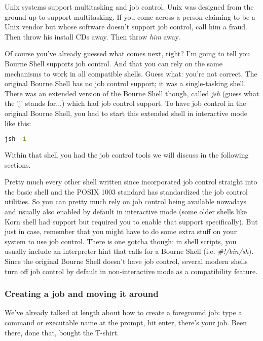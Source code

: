 Unix systems support multitasking and job control. Unix was designed from the
ground up to support multitasking. If you come across a person claiming to be a
Unix vendor but whose software doesn't support job control, call him a fraud.
Then throw his install CDs away. Then throw \textit{him} away.

Of course you've already guessed what comes next, right? I'm going to tell you
Bourne Shell supports job control. And that you can rely on the same mechanisms
to work in all compatible shells. Guess what: you're not correct. The original
Bourne Shell has no job control support; it was a single-tasking shell. There
was an extended version of the Bourne Shell though, called \textit{jsh} (guess
what the 'j' stands for...) which had job control support. To have job control
in the original Bourne Shell, you had to start this extended shell in
interactive mode like this:
\lstset{basicstyle=\scriptsize, numbers=left, captionpos=b, tabsize=4}
\begin{lstlisting}[language={bash},
xleftmargin=15pt]
jsh -i
\end{lstlisting}

Within that shell you had the job control tools we will discuss in the
following sections.

Pretty much every other shell written since incorporated job control straight
into the basic shell and the POSIX 1003 standard has standardized the job
control utilities. So you can pretty much rely on job control being available
nowadays and usually also enabled by default in interactive mode (some older
shells like Korn shell had support but required you to enable that support
specifically). But just in case, remember that you might have to do some extra
stuff on your system to use job control. There is one gotcha though: in shell
scripts, you usually include an interpreter hint that calls for a Bourne Shell
(i.e. \textit{\#!/bin/sh}). Since the original Bourne Shell doesn't have job
control, several modern shells turn off job control by default in
non-interactive mode as a compatibility feature.

\subsubsection{Creating a job and moving it around}
We've already talked at length about how to create a foreground job: type a
command or executable name at the prompt, hit enter, there's your job. Been
there, done that, bought the T-shirt.


